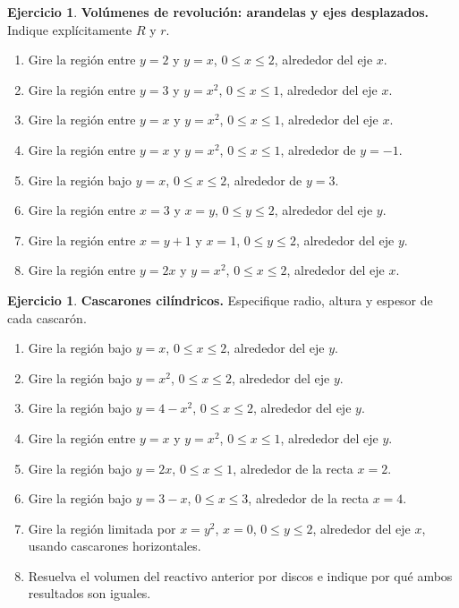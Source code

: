 \documentclass[12pt]{article}
\theoremstyle{definition}
\newtheorem{Ejer}[teorema]{Ejercicio}
\theoremstyle{remark}
\begin{document}
\begin{Ejer}\textbf{Volúmenes de revolución: arandelas y ejes desplazados.} Indique explícitamente $R$ y $r$.
\begin{enumerate}[resume=banco3]
\item Gire la región entre $y=2$ y $y=x$, $0\le x\le2$, alrededor del eje $x$.
\item Gire la región entre $y=3$ y $y=x^2$, $0\le x\le1$, alrededor del eje $x$.
\item Gire la región entre $y=x$ y $y=x^2$, $0\le x\le1$, alrededor del eje $x$.
\item Gire la región entre $y=x$ y $y=x^2$, $0\le x\le1$, alrededor de $y=-1$.
\item Gire la región bajo $y=x$, $0\le x\le2$, alrededor de $y=3$.
\item Gire la región entre $x=3$ y $x=y$, $0\le y\le2$, alrededor del eje $y$.
\item Gire la región entre $x=y+1$ y $x=1$, $0\le y\le2$, alrededor del eje $y$.
\item Gire la región entre $y=2x$ y $y=x^2$, $0\le x\le2$, alrededor del eje $x$.
\end{enumerate}
\end{Ejer}

\begin{Ejer}\textbf{Cascarones cilíndricos.} Especifique radio, altura y espesor de cada cascarón.
\begin{enumerate}[resume=banco3]
\item Gire la región bajo $y=x$, $0\le x\le2$, alrededor del eje $y$.
\item Gire la región bajo $y=x^2$, $0\le x\le2$, alrededor del eje $y$.
\item Gire la región bajo $y=4-x^2$, $0\le x\le2$, alrededor del eje $y$.
\item Gire la región entre $y=x$ y $y=x^2$, $0\le x\le1$, alrededor del eje $y$.
\item Gire la región bajo $y=2x$, $0\le x\le1$, alrededor de la recta $x=2$.
\item Gire la región bajo $y=3-x$, $0\le x\le3$, alrededor de la recta $x=4$.
\item Gire la región limitada por $x=y^2$, $x=0$, $0\le y\le2$, alrededor del eje $x$, usando cascarones horizontales.
\item Resuelva el volumen del reactivo anterior por discos e indique por qué ambos resultados son iguales.
\end{enumerate}
\end{Ejer}
\end{document}
